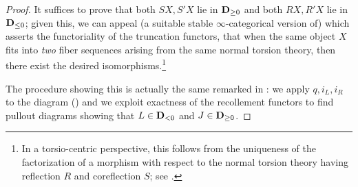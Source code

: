 \begin{proof}
It suffices to prove that both $SX, S'X$ lie in $\textbf{D}_{\ge 0}$ and both $RX, R'X$ lie in $\textbf{D}_{\le 0}$; given this, we can appeal (a suitable stable $\infty$\hyp{}categorical version of) \cite[ \textbf{1.1.9}]{BBDPervers} which asserts the functoriality of the truncation functors, \ie that when the same object $X$ fits into \emph{two} fiber sequences arising from the same normal torsion theory, then there exist the desired isomorphisms.\footnote{In a torsio\hyp{}centric perspective, this follows from the uniqueness of the factorization of a morphism with respect to the normal torsion theory having reflection $R$ and coreflection $S$; see .}

The procedure showing this is actually the same remarked in : we apply $q,i_L, i_R$ to the diagram () and we exploit exactness of the recollement functors to find pullout diagrams showing that $L\in \textbf{D}_{<0}$ and $J\in \textbf{D}_{\ge 0}$.


\end{proof}
